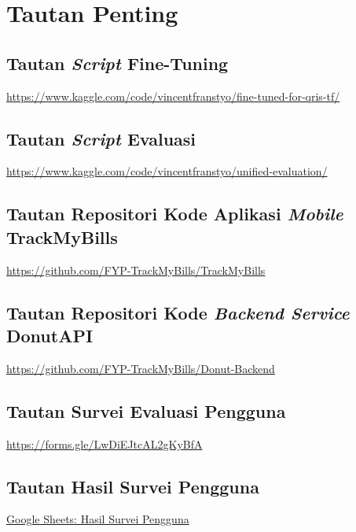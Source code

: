 \chapter{Tautan Penting}
\label{chapter:tautan-penting}

\section{Tautan \emph{Script} Fine-Tuning}
\href{https://www.kaggle.com/code/vincentfranstyo/fine-tuned-for-qris-tf/}{https://www.kaggle.com/code/vincentfranstyo/fine-tuned-for-qris-tf/}

\section{Tautan \emph{Script} Evaluasi}
\href{https://www.kaggle.com/code/vincentfranstyo/unified-evaluation/}
{https://www.kaggle.com/code/vincentfranstyo/unified-evaluation/}

\section{Tautan Repositori Kode Aplikasi \emph{Mobile} TrackMyBills}
\href{https://github.com/FYP-TrackMyBills/TrackMyBills}{https://github.com/FYP-TrackMyBills/TrackMyBills}

\section{Tautan Repositori Kode \emph{Backend Service} DonutAPI}
\href{https://github.com/FYP-TrackMyBills/Donut-Backend}
{https://github.com/FYP-TrackMyBills/Donut-Backend}

\section{Tautan Survei Evaluasi Pengguna}
\href{https://forms.gle/LwDiEJtcAL2gKyBfA}{https://forms.gle/LwDiEJtcAL2gKyBfA}

\section{Tautan Hasil Survei Pengguna}
\href{https://docs.google.com/spreadsheets/d/1a2Q1Kio0whC7-fwUD3y7AQzv5Cw0PaTOwEdsp9prtck/edit?resourcekey=&gid=529123852#gid=529123852}{Google Sheets: Hasil Survei Pengguna}